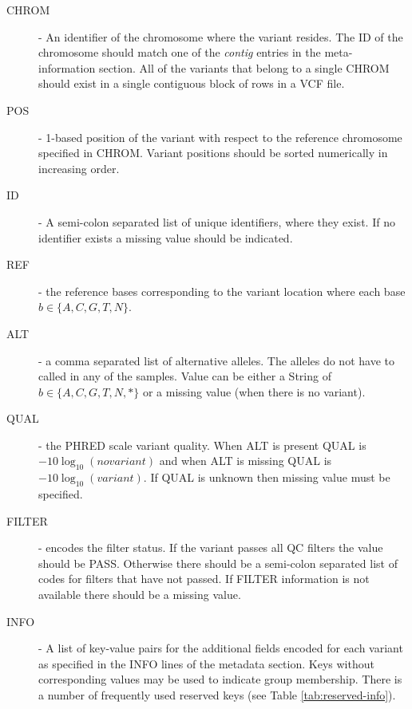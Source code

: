 \begin{description}
    \item [CHROM] - An identifier of the chromosome where the variant resides. The ID of the chromosome should match one of the \emph{contig} entries in the meta-information section. All of the variants that belong to a single CHROM should exist in a single contiguous block of rows in a VCF file.
    \item [POS] - 1-based position of the variant with respect to the reference chromosome specified in CHROM. Variant positions should be sorted numerically in increasing order.
    \item [ID] - A semi-colon separated list of unique identifiers, where they exist. If no identifier exists a missing value should be indicated.
    \item [REF] - the reference bases corresponding to the variant location where each base $b \in \{A,C,G,T,N\}$.
    \item [ALT] - a comma separated list of alternative alleles. The alleles do not have to called in any of the samples. Value can be either a String of $b \in \{A,C,G,T,N,*\}$ or a missing value (when there is no variant).
    \item [QUAL] - the PHRED scale variant quality. When ALT is present QUAL is $-10\log_{10}({no variant})$ and when ALT is missing QUAL is $-10\log_{10}({variant})$. If QUAL is unknown then missing value must be specified.
    \item [FILTER] - encodes the filter status. If the variant passes all QC filters the value should be PASS. Otherwise there should be a semi-colon separated list of codes for filters that have not passed. If FILTER information is not available there should be a missing value.
    \item [INFO] - A list of key-value pairs for the additional fields encoded for each variant as specified in the INFO lines of the metadata section. Keys without corresponding values may be used to indicate group membership. There is a number of frequently used reserved keys (see Table \ref{tab:reserved-info}).
\end{description}
 
